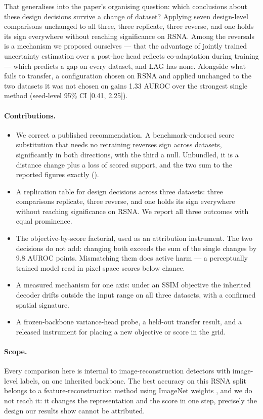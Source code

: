 \documentclass[pmlr,twocolumn,10pt]{jmlr} %
\begin{document}
That generalises into the paper's organising question: which conclusions about these design
decisions survive a change of dataset? Applying seven design-level comparisons unchanged to
all three, three replicate, three reverse, and one holds its sign everywhere without
reaching significance on RSNA. Among the reversals is a mechanism we proposed ourselves ---
that the advantage of jointly trained uncertainty estimation over a post-hoc head reflects
co-adaptation during training --- which predicts a gap on every dataset, and LAG has none.
Alongside what fails to transfer, a configuration chosen on RSNA and applied unchanged to
the two datasets it was not chosen on gains 1.33 AUROC over the strongest single method
(seed-level 95\% CI [0.41, 2.25]).

\paragraph*{Contributions.}

\begin{itemize}
\item We correct a published recommendation. A benchmark-endorsed score substitution that
  needs no retraining reverses sign across datasets, significantly in both directions, with
  the third a null. Unbundled, it is a distance change plus a loss of scored support, and
  the two sum to the reported figures exactly ().
\item A replication table for design decisions across three datasets: three comparisons
  replicate, three reverse, and one holds its sign everywhere without reaching significance
  on RSNA. We report all three outcomes with equal prominence.
\item The objective-by-score factorial, used as an attribution instrument. The two
  decisions do not add: changing both exceeds the sum of the single changes by 9.8 AUROC
  points. Mismatching them does active harm --- a perceptually trained model read in pixel
  space scores below chance.
\item A measured mechanism for one axis: under an SSIM objective the inherited decoder
  drifts outside the input range on all three datasets, with a confirmed spatial signature.
\item A frozen-backbone variance-head probe, a held-out transfer result, and a released
  instrument for placing a new objective or score in the grid.
\end{itemize}

\paragraph*{Scope.}
Every comparison here is internal to image-reconstruction detectors with image-level labels,
on one inherited backbone. The best accuracy on this RSNA split belongs to a
feature-reconstruction method using ImageNet weights \citep{meissen2023fae}, and we do not
reach it: it changes the representation and the score in one step, precisely the design our
results show cannot be attributed.
\end{document}
